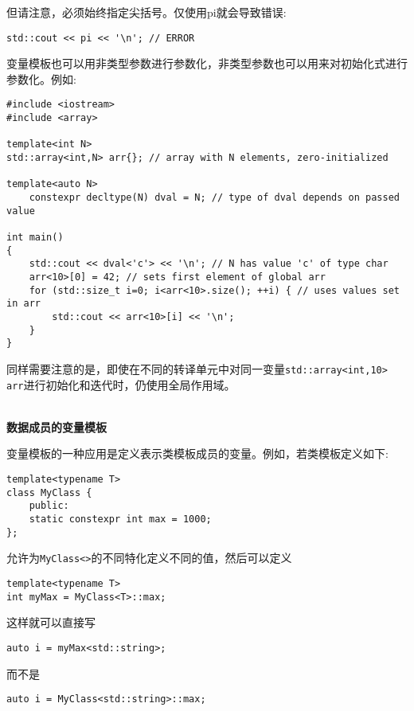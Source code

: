 但请注意，必须始终指定尖括号。仅使用pi就会导致错误:

\begin{lstlisting}[style=styleCXX]
std::cout << pi << '\n'; // ERROR
\end{lstlisting}

变量模板也可以用非类型参数进行参数化，非类型参数也可以用来对初始化式进行参数化。例如:

\begin{lstlisting}[style=styleCXX]
#include <iostream>
#include <array>

template<int N>
std::array<int,N> arr{}; // array with N elements, zero-initialized

template<auto N>
	constexpr decltype(N) dval = N; // type of dval depends on passed value

int main()
{
	std::cout << dval<'c'> << '\n'; // N has value 'c' of type char
	arr<10>[0] = 42; // sets first element of global arr
	for (std::size_t i=0; i<arr<10>.size(); ++i) { // uses values set in arr
		std::cout << arr<10>[i] << '\n';
	}
}
\end{lstlisting}

同样需要注意的是，即使在不同的转译单元中对同一变量\texttt{std::array<int,10> arr}进行初始化和迭代时，仍使用全局作用域。

\hspace*{\fill} \\ %
\noindent
\textbf{数据成员的变量模板}

变量模板的一种应用是定义表示类模板成员的变量。例如，若类模板定义如下:

\begin{lstlisting}[style=styleCXX]
template<typename T>
class MyClass {
	public:
	static constexpr int max = 1000;
};
\end{lstlisting}

允许为\texttt{MyClass<>}的不同特化定义不同的值，然后可以定义

\begin{lstlisting}[style=styleCXX]
template<typename T>
int myMax = MyClass<T>::max;
\end{lstlisting}

这样就可以直接写

\begin{lstlisting}[style=styleCXX]
auto i = myMax<std::string>;
\end{lstlisting}

而不是

\begin{lstlisting}[style=styleCXX]
auto i = MyClass<std::string>::max;
\end{lstlisting}

